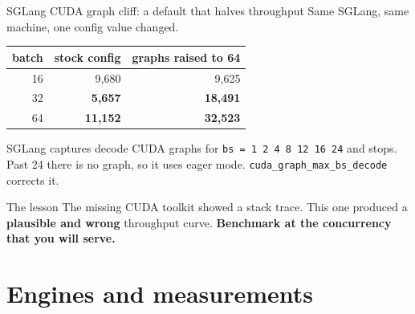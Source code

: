 \documentclass[aspectratio=169,10pt]{beamer}
\newcommand{\emphc}[1]{\textcolor{accent}{\textbf{#1}}}
\newcommand{\warnc}[1]{\textcolor{warn}{\textbf{#1}}}
\newcommand{\goodc}[1]{\textcolor{good}{\textbf{#1}}}
\begin{document}
\begin{frame}{SGLang CUDA graph cliff: a default that halves throughput}
  Same SGLang, same machine, one config value changed.
  \vspace{0.4em}
  \begin{center}
    \begin{tabular}{rrr}
      \toprule
      \textbf{batch} & \textbf{stock config} & \textbf{graphs raised to 64} \\
      \midrule
      16 & 9,680 & 9,625 \\
      32 & \warnc{5,657} & \goodc{18,491} \\
      64 & \warnc{11,152} & \goodc{32,523} \\
      \bottomrule
    \end{tabular}
  \end{center}
  \vspace{0.6em}
  SGLang captures decode CUDA graphs for
  \texttt{bs = 1 2 4 8 12 16 24} and stops. Past 24 there is no graph, so it
  uses eager mode. \texttt{cuda\_graph\_max\_bs\_decode} corrects it.
  \vspace{0.5em}
  \begin{center}
    \begin{minipage}{0.93\textwidth}
      \begin{alertblock}{The lesson}
        The missing CUDA toolkit showed a stack trace. This one
        produced a \textbf{plausible and wrong} throughput curve.
        \emphc{Benchmark at the concurrency that you will serve.}
      \end{alertblock}
    \end{minipage}
  \end{center}
\end{frame}



\section{Engines and measurements}

\end{document}
